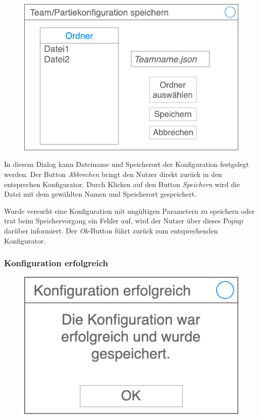     \begin{figure}[H]
        \centering
        \includegraphics[width=\textwidth/2]{../Meilenstein03/images/speichern}
    \end{figure}

    In diesem Dialog kann Dateiname und Speicherort der Konfiguration festgelegt werden. Der Button \textit{Abbrechen} bringt den Nutzer direkt zurück in den entsprechen Konfigurator. Durch Klicken auf den Button \textit{Speichern} wird die Datei mit dem gewählten Namen und Speicherort gespeichert.

    Wurde versucht eine Konfiguration mit ungültigen Parametern zu speichern oder trat beim Speichervorgang ein Fehler auf, wird der Nutzer über dieses Popup darüber informiert. Der \textit{Ok}-Button führt zurück zum entsprechenden Konfigurator.

    \subsubsection{Konfiguration erfolgreich}

    \begin{figure}[H]
        \centering
        \includegraphics[width=\textwidth/2]{../Meilenstein03/images/konfiguration_erfolgreich}
    \end{figure}

